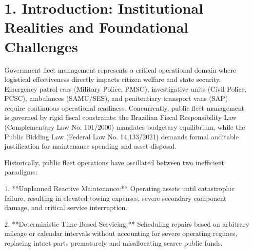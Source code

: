 \documentclass[10pt,a4paper,journal]{article}
\begin{document}
\begin{abstract}
auction under statutory thresholds. All raw datasets maintain cryptographic SHA-256 block provenance.

**Keywords:** Prescriptive Analytics; Mixed-Integer Linear Programming; Machine Learning Calibration; Public Fleet Management; Total Cost of Ownership; Algorithmic Governance.

---

\end{abstract}

\section{1. Introduction: Institutional Realities and Foundational Challenges}
Government fleet management represents a critical operational domain where logistical effectiveness directly impacts citizen welfare and state security. Emergency patrol cars (Military Police, PMSC), investigative units (Civil Police, PCSC), ambulances (SAMU/SES), and penitentiary transport vans (SAP) require continuous operational readiness. Concurrently, public fleet management is governed by rigid fiscal constraints: the Brazilian Fiscal Responsibility Law (Complementary Law No. 101/2000) mandates budgetary equilibrium, while the Public Bidding Law (Federal Law No. 14,133/2021) demands formal auditable justification for maintenance spending and asset disposal.

Historically, public fleet operations have oscillated between two inefficient paradigms:

1. **Unplanned Reactive Maintenance:** Operating assets until catastrophic failure, resulting in elevated towing expenses, severe secondary component damage, and critical service interruption.

2. **Deterministic Time-Based Servicing:** Scheduling repairs based on arbitrary mileage or calendar intervals without accounting for severe operating regimes, replacing intact parts prematurely and misallocating scarce public funds.
\end{document}
